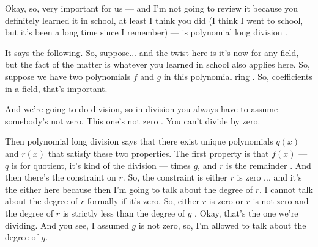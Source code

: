 \begin{speech}[00:26:17 - 00:28:09]
Okay, so, very important for us --- and I'm not going to review it because you definitely learned it in school, at least I think you did (I think I went to school, but it's been a long time since I remember) --- is polynomial long division .

It says the following. So, suppose... and the twist here is it's now for any field, but the fact of the matter is whatever you learned in school also applies here. So, suppose we have two polynomials $f$ and $g$ in this polynomial ring . So, coefficients in a field, that's important.

And we're going to do division, so in division you always have to assume somebody's not zero. This one's not zero . You can't divide by zero.

Then polynomial long division says that there exist unique polynomials  $q(x)$ and $r(x)$  that satisfy these two properties. The first property is that $f(x)$ --- $q$ is for quotient, it's kind of the division --- times $g$, and $r$ is the remainder . And then there's the constraint on $r$. So, the constraint is either $r$ is zero ... and it's the either here because then I'm going to talk about the degree of $r$. I cannot talk about the degree of $r$ formally if it's zero. So, either $r$ is zero or $r$ is not zero  and the degree of $r$ is strictly less than the degree of $g$ . Okay, that's the one we're dividing. And you see, I assumed $g$ is not zero, so, I'm allowed to talk about the degree of $g$.
\end{speech}

